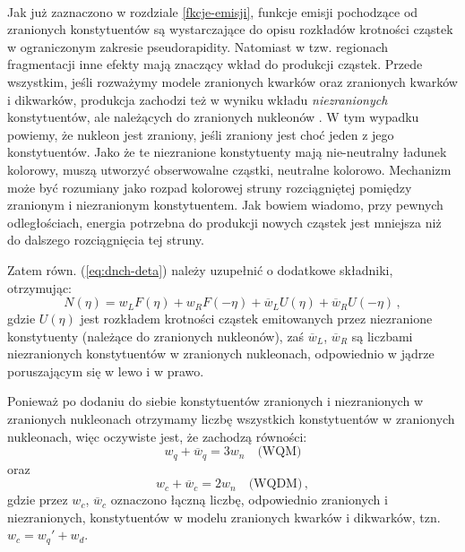 \documentclass[a4paper,12pt]{article}
\begin{document}
\paragraph{}
Jak już zaznaczono w rozdziale \ref{fkcje-emisji}, funkcje emisji pochodzące od zranionych konstytuentów są wystarczające do opisu rozkładów krotności cząstek w ograniczonym zakresie pseudorapidity. Natomiast w tzw. regionach fragmentacji inne efekty mają znaczący wkład do produkcji cząstek. Przede wszystkim, jeśli rozważymy modele zranionych kwarków oraz zranionych kwarków i dikwarków, produkcja zachodzi też w wyniku wkładu \textit{niezranionych} konstytuentów, ale należących do zranionych nukleonów \cite{Bialas:2007eg}. W tym wypadku powiemy, że nukleon jest zraniony, jeśli zraniony jest choć jeden z jego konstytuentów. Jako że te niezranione konstytuenty mają nie-neutralny ładunek kolorowy, muszą utworzyć obserwowalne cząstki, neutralne kolorowo. Mechanizm może być rozumiany jako rozpad kolorowej struny rozciągniętej pomiędzy zranionym i niezranionym konstytuentem. Jak bowiem wiadomo, przy pewnych odległościach, energia potrzebna do produkcji nowych cząstek jest mniejsza niż do dalszego rozciągnięcia tej struny.

Zatem równ. (\ref{eq:dnch-deta}) należy uzupełnić o dodatkowe składniki, otrzymując:
\begin{equation} \label{eq:n-with-unwounded}
N(\eta) = w_L F(\eta) + w_R F(-\eta) + \overline{w}_L U(\eta) + \overline{w}_R U(-\eta)  \,,
\end{equation}
gdzie $U(\eta)$ jest rozkładem krotności cząstek emitowanych przez niezranione konstytuenty (należące do zranionych nukleonów), zaś $\overline{w}_L$, $\overline{w}_R$ są liczbami niezranionych konstytuentów w zranionych nukleonach, odpowiednio w jądrze poruszającym się w lewo i w prawo.

Ponieważ po dodaniu do siebie konstytuentów zranionych i niezranionych w zranionych nukleonach otrzymamy liczbę wszystkich konstytuentów w zranionych nukleonach, więc oczywiste jest, że zachodzą równości:
\begin{equation}
w_q + \overline{w}_q = 3 w_n \quad \text{(WQM)}
\end{equation}
oraz
\begin{equation}
w_c + \overline{w}_c = 2 w_n \quad \text{(WQDM)}\,,
\end{equation}
gdzie przez $w_c$, $\overline{w}_c$ oznaczono łączną liczbę, odpowiednio zranionych i niezranionych, konstytuentów w modelu zranionych kwarków i dikwarków, tzn. $w_c = w_q' + w_d$. 
\end{document}
